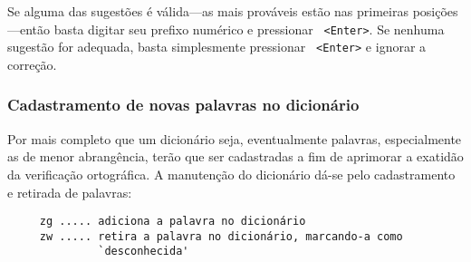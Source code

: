 Se alguma das sugestões é válida---as mais prováveis estão nas primeiras
posições---então basta digitar seu prefixo numérico e pressionar {\tt
<Enter>}. Se nenhuma sugestão for adequada, basta simplesmente pressionar {\tt
<Enter>} e ignorar a correção.

\subsubsection{Cadastramento de novas palavras no dicionário}

Por mais completo que um dicionário seja, eventualmente palavras,
especialmente as de menor abrangência, terão que ser cadastradas a fim de
aprimorar a exatidão da verificação ortográfica. A manutenção do dicionário 
dá-se pelo cadastramento e retirada de palavras:

\begin{verbatim}
     zg ..... adiciona a palavra no dicionário
     zw ..... retira a palavra no dicionário, marcando-a como 
              `desconhecida'
\end{verbatim}
